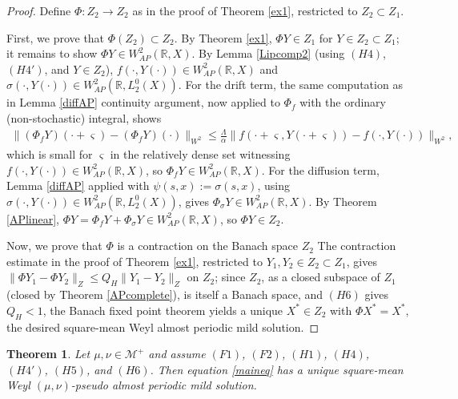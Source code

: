 \documentclass[11pt]{amsart}
\newtheorem{theorem}{Theorem}[section]
\begin{document}
\begin{proof}
Define $\Phi:Z_2\to Z_2$ as in the proof of Theorem \ref{ex1}, restricted to $Z_2\subset Z_1$.

First, we prove that $\Phi(Z_2)\subset Z_2$. By Theorem \ref{ex1}, $\Phi Y\in Z_1$ for $Y\in Z_2\subset Z_1$; it remains to show $\Phi Y\in W^2_{AP}(\mathbb R,X)$. By Lemma \ref{Lipcomp2} (using $(H4)$, $(H4')$, and $Y\in Z_2$), $f(\cdot,Y(\cdot))\in W^2_{AP}(\mathbb R,X)$ and $\sigma(\cdot,Y(\cdot))\in W^2_{AP}(\mathbb R,L^0_2(X))$. For the drift term, the same computation as in Lemma \ref{diffAP} continuity argument, now applied to $\Phi_f$ with the ordinary (non-stochastic) integral, shows
\begin{align*}
\|(\Phi_fY)(\cdot+\varsigma)-(\Phi_fY)(\cdot)\|_{W^2}\leq\frac{\Lambda}{\alpha}\|f(\cdot+\varsigma,Y(\cdot+\varsigma))-f(\cdot,Y(\cdot))\|_{W^2},
\end{align*}
which is small for $\varsigma$ in the relatively dense set witnessing $f(\cdot,Y(\cdot))\in W^2_{AP}(\mathbb R,X)$, so $\Phi_fY\in W^2_{AP}(\mathbb R,X)$. For the diffusion term, Lemma \ref{diffAP} applied with $\psi(s,x):=\sigma(s,x)$, using $\sigma(\cdot,Y(\cdot))\in W^2_{AP}(\mathbb R,L^0_2(X))$, gives $\Phi_\sigma Y\in W^2_{AP}(\mathbb R,X)$. By Theorem \ref{APlinear}, $\Phi Y=\Phi_fY+\Phi_\sigma Y\in W^2_{AP}(\mathbb R,X)$, so $\Phi Y\in Z_2$.

Now, we prove that $\Phi$ is a contraction on the Banach space $Z_2$ The contraction estimate in the proof of Theorem \ref{ex1}, restricted to $Y_1,Y_2\in Z_2\subset Z_1$, gives $\|\Phi Y_1-\Phi Y_2\|_Z\le Q_H\|Y_1-Y_2\|_Z$ on $Z_2$; since $Z_2$, as a closed subspace of $Z_1$ (closed by Theorem \ref{APcomplete}), is itself a Banach space, and $(H6)$ gives $Q_H<1$, the Banach fixed point theorem yields a unique $X^\ast\in Z_2$ with $\Phi X^\ast=X^\ast$, the desired square-mean Weyl almost periodic mild solution.
\end{proof}

\begin{theorem}\label{ex3}
Let $\mu,\nu\in\mathcal M^+$ and assume $(F1)$, $(F2)$, $(H1)$, $(H4)$, $(H4')$, $(H5)$, and $(H6)$. Then equation \eqref{maineq} has a unique square-mean Weyl $(\mu,\nu)$-pseudo almost periodic mild solution.
\end{theorem}
\end{document}
